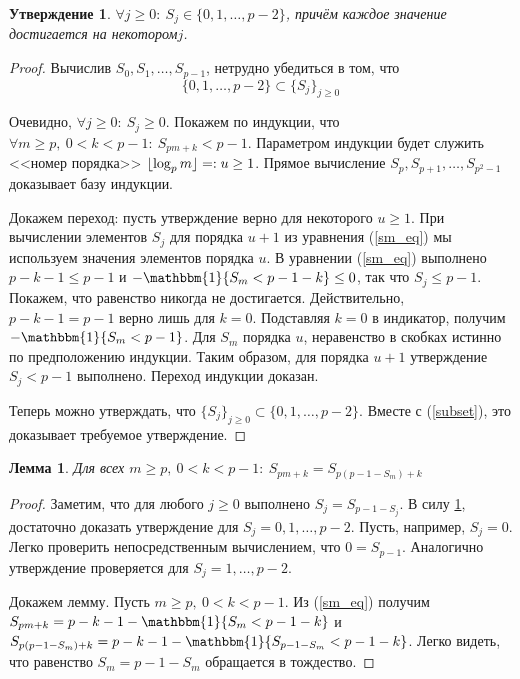 \documentclass[14pt, a4paper, russian]{report}
\DeclarePairedDelimiter\floor{\lfloor}{\rfloor}
\newtheorem{lemma}{\indent Лемма}
\newtheorem{proposition}{\indent Утверждение}
\begin{document}
\begin{proposition} \label{sm_estimate}
$\forall j \ge 0:\ S_j \in \{0, 1, \ldots, p-2\}$, причём каждое значение достигается на некотором\nobreakspace$j$.
\end{proposition}
\begin{proof}
Вычислив $S_0, S_1, \ldots, S_{p-1}$, нетрудно убедиться в том, что
\begin{equation}\label{subset}
\{0,1,\ldots,p-2\} \subset \{S_j\}_{j \ge 0}
\end{equation}

Очевидно, $\forall j \ge 0:\ S_j \ge 0$.
Покажем по индукции, что $\forall m \ge p,\ 0 < k < p-1:\ S_{pm+k} < p-1$. Параметром индукции будет служить <<номер порядка>> $\floor{\log_p m} =: u \ge 1$. Прямое вычисление $S_p, S_{p+1}, \ldots, S_{p^2-1}$ доказывает базу индукции.

Докажем переход: пусть утверждение верно для некоторого $u \ge 1$. При вычислении элементов $S_j$ для порядка $u+1$ из уравнения (\ref{sm_eq}) мы используем значения элементов порядка $u$. В уравнении (\ref{sm_eq}) выполнено $p-k-1 \le p-1$ и $-\mathbbm{1}\{S_m < p-1-k\} \le 0$, так что $S_j \le p-1$. Покажем, что равенство никогда не достигается. Действительно, $p-k-1 = p-1$ верно лишь для $k=0$. Подставляя $k=0$ в индикатор, получим $- \mathbbm{1}\{S_m < p-1\}$. Для $S_m$ порядка $u$, неравенство в скобках истинно по предположению индукции. Таким образом, для порядка $u+1$ утверждение $S_j < p-1$ выполнено. Переход индукции доказан.

Теперь можно утверждать, что $\{S_j\}_{j \ge 0} \subset \{0,1,\ldots,p-2\}$. Вместе с (\ref{subset}), это доказывает требуемое утверждение.
\end{proof}
\begin{lemma} \label{sm2}
Для всех $m \ge p,\ 0 < k < p-1:\ S_{pm+k}=S_{p(p-1-S_m)+k}$
\end{lemma}
\begin{proof}
Заметим, что для любого $j \ge 0$ выполнено $S_j = S_{p-1 - S_j}$. В силу \cref{sm_estimate}, достаточно доказать утверждение для $S_j=0,1,\ldots,p-2$. Пусть, например, $S_j=0$. Легко проверить непосредственным вычислением, что $0 = S_{p-1}$. Аналогично утверждение проверяется для $S_j=1,\ldots,p-2$.

Докажем лемму. Пусть $m \ge p,\ 0 < k < p-1$. Из (\ref{sm_eq}) получим $S_{pm+k}=p-k-1 - \mathbbm{1}\{S_m < p-1-k\}$ и $S_{p(p-1-S_m)+k}= p-k-1 - \mathbbm{1}\{S_{p-1-S_m} < p-1-k\}$. Легко видеть, что равенство $S_m=p-1-S_m$ обращается в тождество.
\end{proof}
\end{document}
